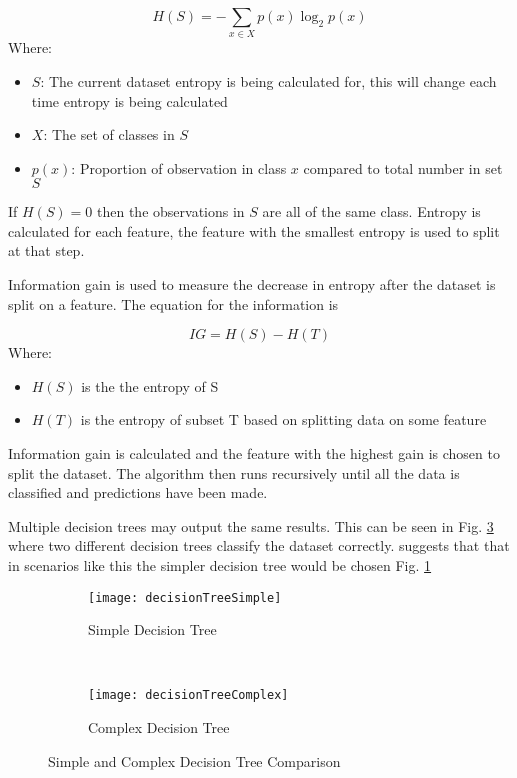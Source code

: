 \begin{equation} \label{eq:entropy}
	H(S) = - \sum_{x \in X} p(x) \log_{2} p(x)
\end{equation}
Where:
\begin{itemize}[label=]
	\item $S$: The current dataset entropy is being calculated for, this will change each time entropy is being calculated
	\item $X$: The set of classes in $S$
	\item $p(x)$: Proportion of observation in class $x$ compared to total number in set $S$
\end{itemize}
If $H(S) = 0$ then the observations in $S$ are all of the same class. Entropy is calculated for each feature, the feature with the smallest entropy is used to split at that step.

Information gain is used to measure the decrease in entropy after the dataset is split on a feature. The equation for the information is 

\begin{equation} \label{eq:infoGain}
	IG = H(S) -  H(T)
\end{equation}
Where:
\begin{itemize}[label=]
	\item $H(S)$ is the the entropy of S
	\item $H(T)$ is the entropy of subset T based on splitting data on some feature
\end{itemize}

Information gain is calculated and the feature with the highest gain is chosen to split the dataset. The algorithm then runs recursively until all the data is classified and predictions have been made. 

Multiple decision trees may output the same results. This can be seen in Fig. \ref{fig:simpleComplex} where two different decision trees classify the dataset correctly. \cite{quinlan_induction_1986} suggests that that in scenarios like this the simpler decision tree would be chosen Fig. \ref{fig:simple}

\begin{figure}[H]
	\centering
	\begin{subfigure}[b]{0.45\textwidth}
		\captionsetup{font=scriptsize}
		\texttt{[image: decisionTreeSimple]}
		\caption{Simple Decision Tree}\label{fig:decisionTreeSimple}
		\label{fig:simple}
	\end{subfigure} ~\quad
	\begin{subfigure}[b]{0.45\textwidth}
		\captionsetup{font=scriptsize}
		\texttt{[image: decisionTreeComplex]}
		\caption{Complex Decision Tree}\label{fig:decisionTreeComplex}
		\label{fig:complex}
	\end{subfigure}
	\caption{Simple and Complex Decision Tree Comparison\\\cite[Source:][]{quinlan_induction_1986}}
	\label{fig:simpleComplex}
\end{figure}


